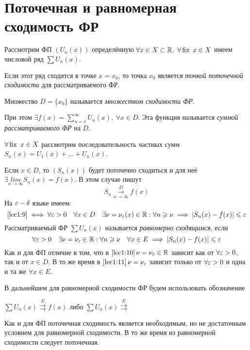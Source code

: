 \documentclass[../../main.tex]{subfiles}
\begin{document}
\section{Поточечная и равномерная сходимость ФР}
Рассмотрим ФП $(U_n(x))$ определённую $\forall x \in X \subset \mathbb{R}$. 
$\forall \operatorname{fix} \ x \in X$ имеем числовой ряд $\sum U_n(x)$. 

Если этот ряд сходится в точке $x = x_0$, то точка $x_0$ является 
\emph{точкой поточечной сходимости} для рассматриваемого ФР. 

Множество $D = \{x_0\}$ называется \emph{множеством сходимости ФР}.

При этом $\exists f(x) = \sum\limits_{n=1}^{\infty} U_n(x),\ \forall x \in D$.
Эта функция называется \emph{суммой рассматриваемого ФР} на $D$.

$\forall \operatorname{fix} \ x \in X$ рассмотрим последовательность частных сумм 
$S_n(x) = U_1(x) + \ldots + U_n(x)$. 	

Если $x \in D$, то $(S_n(x))$ будет поточечно сходиться и для неё 
$\exists \underset{n \to \infty}{lim} S_n(x) = f(x)$. В этом случае
пишут 
\begin{equation}
\label{lec1:9}
S_n \overset{D}{\underset{n \to \infty}\longrightarrow} f(x)
\end{equation}
На $\varepsilon-\delta$ языке имеем:
\begin{equation}
\label{lec1:10}
\eqref{lec1:9} \iff \forall \varepsilon > 0\quad
\forall x \in D \quad \exists \nu = \nu_\varepsilon(x) \in \mathbb{R} :
\forall n \geqslant \nu \implies |S_n(x) - f(x)| \leqslant \varepsilon 
\end{equation}
Рассматриваемый ФР $\sum U_n(x)$ называется \emph{равномерно сходящимся},
если  
\begin{equation}
\label{lec1:11}
\forall \varepsilon > 0 \quad \exists \nu = \nu_\varepsilon \in \mathbb{R} :
\forall n \geqslant \nu \quad \forall x \in E \implies 
|S_n(x) - f(x)| \leqslant \varepsilon
\end{equation}
Как и для ФП отличие в том, что в $\eqref{lec1:10}\, \nu = \nu_\varepsilon \in \mathbb{R}$ 
зависит как от $\forall \varepsilon > 0$, так и от $x \in D$. В то же время в 
$\eqref{lec1:11}\, \nu = \nu_\varepsilon$ зависит только от $\forall \varepsilon > 0$ и 
одна и та же $\forall x \in E$.  

В дальнейшем для равномерной сходимости ФР будем использовать обозначение
 
$\sum U_n(x) \overset{E}{\rightrightarrows} f(x)$ либо 
$\sum U_n(x) \overset{E}{\rightrightarrows}$

Как и для ФП поточечная сходимость является необходимым, 
но не достаточным условием для равномерной сходимости. В то же время
из равномерной сходимости следует поточечная.
\end{document}

